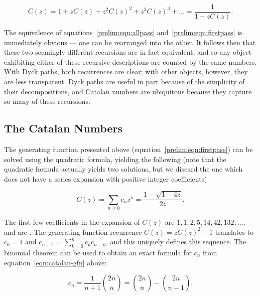 \documentclass[12pt,twoside]{memoir}
\begin{document}
      \begin{equation} \label{prelim:eqn:allpass}
        C(z) = 1 + zC(z) + z^2 C(z)^2 + z^3 C(z)^3 + \dots = \frac{1}{1 - zC(z)}.
      \end{equation}

      The equivalence of equations~\ref{prelim:eqn:allpass}
      and~\ref{prelim:eqn:firstpass} is immediately obvious --- one can be
      rearranged into the other.
      It follows then that these two seemingly different recursions are in fact
      equivalent, and so any object exhibiting either of these recursive
      descriptions are counted by the same numbers. 
      With Dyck paths, both recurrences are clear;
      with other objects, however, they are less transparent. Dyck paths are
      useful in part because of the simplicity of their decompositions, and
      Catalan numbers are ubiquitous because they capture so many of these
      recursions. 

    \subsection{The Catalan Numbers}
    \label{prelim:sub:catalan}
      
      The generating function presented above
      (equation~\ref{prelim:eqn:firstpass}) can be solved using the quadratic
      formula, yielding the following (note that the quadratic formula actually
      yields two solutions, but we discard the one which does not have a series
      expansion with positive integer coefficients) 

      \begin{equation} \label{eqn:catalan-gfn}
        C(z) = \sum_{n \geq 0} c_n z^n = \frac{1 - \sqrt{1 - 4z}}{2z}.
      \end{equation}

      The first few coefficients in the expansion of $C(z)$ are
      $1,1,2, 5, 14, 42, 132, \dots$, and are .  The generating
      function recurrence $C(z) = zC(z)^2 + 1$ translates to $c_0 =1$ and
      $c_{n+1} = \sum_{k=0}^n c_{k} c_{n-k}$, and this uniquely defines this
      sequence.  The binomial theorem can be used to obtain an exact formula for
      $c_n$ from equation~\ref{eqn:catalan-gfn} above:

      \begin{equation} \label{eqn:catalan-exact}
        c_n = \frac{1}{n+1} \binom{2n}{n} = \binom{2n}{n} - \binom{2n}{n-1}.
      \end{equation}
\end{document}
